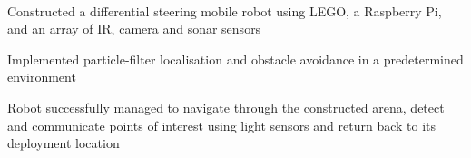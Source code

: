 \documentclass[]{lukas-cv-openfont}
\begin{document}

\noindent
{}
\\
\begin{tightitemize}{1.7em}
    \item Constructed a differential steering mobile robot using LEGO, a Raspberry Pi, and an array of IR, camera and sonar sensors
    \item Implemented particle-filter localisation and obstacle avoidance in a predetermined environment
    \item Robot successfully managed to navigate through the constructed arena, detect and communicate points of interest using light sensors and return back to its deployment location
\end{tightitemize}
\end{document}
